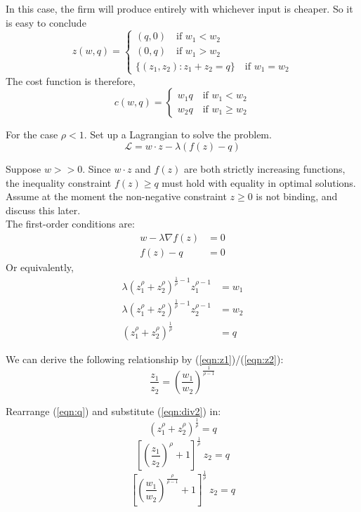 \documentclass{article}
\begin{document}
\begin{enumerate}
In this case, the firm will produce entirely with whichever input is cheaper. 
So it is easy to conclude
\[ 
    z(w,q) = 
    \begin{cases}
        (q,0)\quad \textrm{if } w_1 < w_2 \\
        (0,q)\quad \textrm{if } w_1 > w_2 \\
        \{ (z_1,z_2): z_1+z_2=q \}\quad \textrm{if } w_1=w_2
    \end{cases}
\]
The cost function is therefore,
\[ 
    c(w,q) = 
    \begin{cases}
        w_1 q \quad \textrm{if } w_1 < w_2 \\
        w_2 q \quad \textrm{if } w_1 \geq w_2 
    \end{cases}
\]

For the case $\rho<1$. Set up a Lagrangian to solve the problem.
\[ \mathcal{L} = w \cdot z - \lambda (f(z)-q)\]

Suppose $w >> 0$. 
Since $w\cdot z$ and $f(z)$ are both strictly increasing functions, 
the inequality constraint $f(z)\geq q$ must hold with equality in optimal solutions. 
Assume at the moment the non-negative constraint $z\geq 0$ is not binding, and 
discuss this later. \\

The first-order conditions are:
\begin{align*}
    w - \lambda \nabla f(z) &= 0 \\
    f(z) - q &= 0
\end{align*}
Or equivalently, 
\begin{align}
   \lambda (z_1^{\rho}+z_2^{\rho})^{\frac{1}{\rho}-1}z_1^{\rho-1} &= w_1 \label{eqn:z1}\\
   \lambda (z_1^{\rho}+z_2^{\rho})^{\frac{1}{\rho}-1}z_2^{\rho-1} &= w_2 \label{eqn:z2}\\
   (z_1^{\rho} + z_2^{\rho})^{\frac{1}{\rho}} &= q \label{eqn:q}
\end{align}

We can derive the following relationship by (\ref{eqn:z1})/(\ref{eqn:z2}):
\begin{equation}
    \label{eqn:div2}
    \frac{z_1}{z_2} = \left(\frac{w_1}{w_2}\right)^{\frac{1}{\rho-1}}
\end{equation}

Rearrange (\ref{eqn:q}) and substitute (\ref{eqn:div2}) in:
\[ (z_1^{\rho} + z_2^{\rho})^{\frac{1}{\rho}} = q \]
\[ \left[ \left( \frac{z_1}{z_2} \right)^{\rho} + 1
   \right]^{\frac{1}{\rho}}\ z_2 = q
\]
\[ \left[ \left(\frac{w_1}{w_2}\right)^{\frac{\rho}{\rho-1}} + 1
   \right]^{\frac{1}{\rho}}\ z_2 = q
\]


\end{enumerate}
\end{document}
